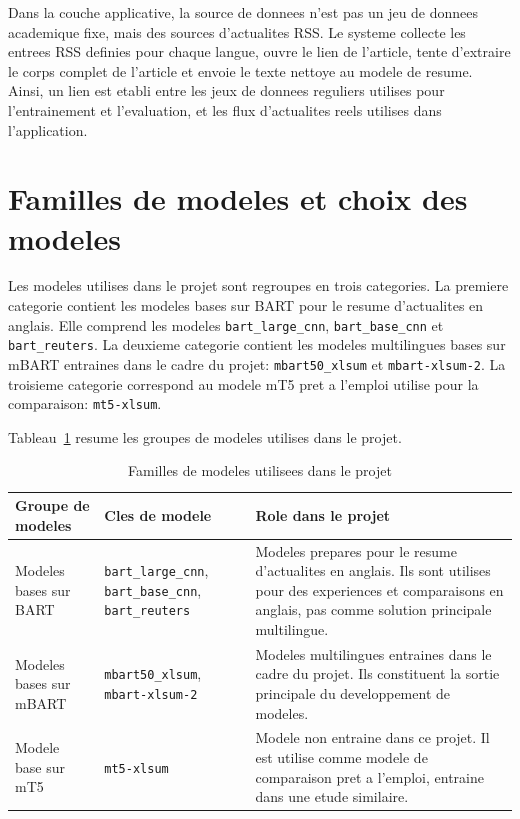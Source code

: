 Dans la couche applicative, la source de donnees n'est pas un jeu de donnees academique fixe, mais des sources d'actualites RSS. Le systeme collecte les entrees RSS definies pour chaque langue, ouvre le lien de l'article, tente d'extraire le corps complet de l'article et envoie le texte nettoye au modele de resume. Ainsi, un lien est etabli entre les jeux de donnees reguliers utilises pour l'entrainement et l'evaluation, et les flux d'actualites reels utilises dans l'application.

\section{Familles de modeles et choix des modeles}

Les modeles utilises dans le projet sont regroupes en trois categories. La premiere categorie contient les modeles bases sur BART pour le resume d'actualites en anglais. Elle comprend les modeles \texttt{bart\_large\_cnn}, \texttt{bart\_base\_cnn} et \texttt{bart\_reuters}. La deuxieme categorie contient les modeles multilingues bases sur mBART entraines dans le cadre du projet: \texttt{mbart50\_xlsum} et \texttt{mbart-xlsum-2}. La troisieme categorie correspond au modele mT5 pret a l'emploi utilise pour la comparaison: \texttt{mt5-xlsum}.

Tableau~\ref{tab:model-families-fr} resume les groupes de modeles utilises dans le projet.

\begin{table}[t]
\caption{Familles de modeles utilisees dans le projet}
\label{tab:model-families-fr}
\centering
\begin{tabular}{|p{3.2cm}|p{4.1cm}|p{6.2cm}|}
\hline
\textbf{Groupe de modeles} & \textbf{Cles de modele} & \textbf{Role dans le projet} \\
\hline
Modeles bases sur BART & \texttt{bart\_large\_cnn}, \texttt{bart\_base\_cnn}, \texttt{bart\_reuters} & Modeles prepares pour le resume d'actualites en anglais. Ils sont utilises pour des experiences et comparaisons en anglais, pas comme solution principale multilingue. \\
\hline
Modeles bases sur mBART & \texttt{mbart50\_xlsum}, \texttt{mbart-xlsum-2} & Modeles multilingues entraines dans le cadre du projet. Ils constituent la sortie principale du developpement de modeles. \\
\hline
Modele base sur mT5 & \texttt{mt5-xlsum} & Modele non entraine dans ce projet. Il est utilise comme modele de comparaison pret a l'emploi, entraine dans une etude similaire. \\
\hline
\end{tabular}
\end{table}

